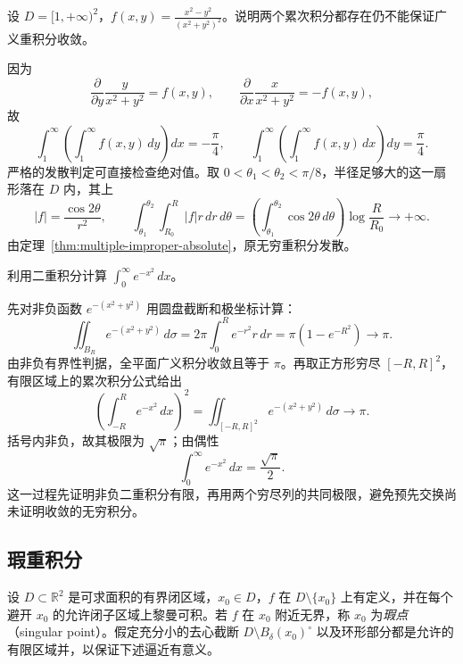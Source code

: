 \documentclass[UTF8,12pt,a4paper,fontset=fandol]{ctexbook}
\begin{document}
\begin{example}
\label{ex:multiple-two-iterates-divergent}
设 $D=[1,+\infty)^2$，$\displaystyle f(x,y)=\frac{x^2-y^2}{(x^2+y^2)^2}$。说明两个累次积分都存在仍不能保证广义重积分收敛。
\end{example}
\begin{solve}
因为
\[
    \frac{\partial}{\partial y}\frac{y}{x^2+y^2}=f(x,y),
    \qquad
    \frac{\partial}{\partial x}\frac{x}{x^2+y^2}=-f(x,y),
\]
故
\[
    \int_1^\infty\left(\int_1^\infty f(x,y)\,dy\right)dx=-\frac\pi4,
    \qquad
    \int_1^\infty\left(\int_1^\infty f(x,y)\,dx\right)dy=\frac\pi4.
\]
严格的发散判定可直接检查绝对值。取 $0<\theta_1<\theta_2<\pi/8$，半径足够大的这一扇形落在 $D$ 内，其上
\[
    |f|=\frac{\cos2\theta}{r^2},\qquad
    \int_{\theta_1}^{\theta_2}\int_{R_0}^R|f|r\,dr\,d\theta
    =\left(\int_{\theta_1}^{\theta_2}\cos2\theta\,d\theta\right)\log\frac R{R_0}\to+\infty.
\]
由定理~\ref{thm:multiple-improper-absolute}，原无穷重积分发散。
\end{solve}

\begin{example}
\label{ex:multiple-gaussian-integral}
利用二重积分计算 $\displaystyle\int_0^\infty e^{-x^2}\,dx$。
\end{example}
\begin{solve}
先对非负函数 $e^{-(x^2+y^2)}$ 用圆盘截断和极坐标计算：
\[
    \iint_{B_R}e^{-(x^2+y^2)}\,d\sigma
    =2\pi\int_0^Re^{-r^2}r\,dr
    =\pi(1-e^{-R^2})\to\pi.
\]
由非负有界性判据，全平面广义积分收敛且等于 $\pi$。再取正方形穷尽 $[-R,R]^2$，有限区域上的累次积分公式给出
\[
    \left(\int_{-R}^Re^{-x^2}\,dx\right)^2
    =\iint_{[-R,R]^2}e^{-(x^2+y^2)}\,d\sigma\to\pi.
\]
括号内非负，故其极限为 $\sqrt\pi$；由偶性
\[
    \int_0^\infty e^{-x^2}\,dx=\frac{\sqrt\pi}{2}.
\]
这一过程先证明非负二重积分有限，再用两个穷尽列的共同极限，避免预先交换尚未证明收敛的无穷积分。
\end{solve}

\subsection{瑕重积分}
\label{subsec:singular-multiple-integrals}

设 $D\subset\mathbb R^2$ 是可求面积的有界闭区域，$x_0\in D$，$f$ 在 $D\setminus\{x_0\}$ 上有定义，并在每个避开 $x_0$ 的允许闭子区域上黎曼可积。若 $f$ 在 $x_0$ 附近无界，称 $x_0$ 为\emph{瑕点}（singular point）。假定充分小的去心截断 $D\setminus B_\delta(x_0)^\circ$ 以及环形部分都是允许的有限区域并，以保证下述逼近有意义。
\end{document}
